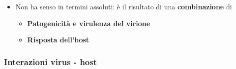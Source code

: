 \documentclass[italian,]{article}
\providecommand{\tightlist}{%
  \setlength{\itemsep}{0pt}\setlength{\parskip}{0pt}}
\begin{document}
\begin{itemize}
\tightlist
\item
  Non ha senso in termini assoluti: è il risultato di una
  \textbf{combinazione} di

  \begin{itemize}
  \tightlist
  \item
    \textbf{Patogenicità e virulenza del virione}
  \item
    \textbf{Risposta dell'host}
  \end{itemize}
\end{itemize}

\hypertarget{interazioni-virus---host}{%
\subsubsection{Interazioni virus -
host}\label{interazioni-virus---host}}
\end{document}
